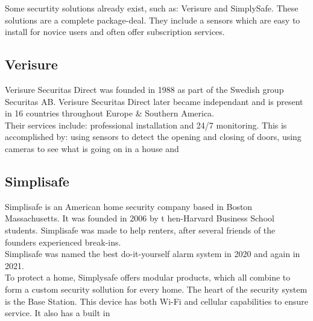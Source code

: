 Some securtity solutions already exist, such as: Verisure and SimplySafe.
These solutions are a complete package-deal. 
They include a sensors which are easy to install for novice users and often offer subscription services.
\subsection{Verisure}
Verisure Securitas Direct was founded in 1988 as part of the Swedish group Securitas AB. 
Verisure Securitas Direct later became independant and is present in 16 countries throughout Europe \& Southern America.
\\
Their services include: professional installation and 24/7 monitoring. This is accomplished by: 
using sensors to detect the opening and closing of doors, 
using cameras to see what is going on in a house and 

\subsection{Simplisafe}
Simplisafe is an American home security company based in Boston Massachusetts. 
It was founded in 2006 by t hen-Harvard Business School students.
Simplisafe was made to help renters, after several friends of the founders experienced break-ins.
\\
Simplisafe was named the best do-it-yourself alarm system in 2020 and again in 2021.
\\
To protect a home, Simplysafe offers modular products, which all combine to form a custom security sollution for every home.
The heart of the security system is the Base Station. This device has both Wi-Fi and cellular capabilities to ensure service.
It also has a built in 

